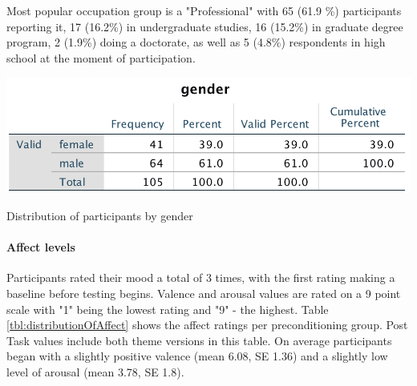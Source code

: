 	Most popular occupation group is a "Professional" with 65 (61.9 \%) participants reporting it, 17 (16.2\%) in undergraduate studies, 16 (15.2\%) in graduate degree program, 2 (1.9\%) doing a doctorate, as well as 5 (4.8\%) respondents in high school at the moment of participation.
	
\begin{table}[h!]
	\centering
	\includegraphics[width=0.7\linewidth]{graphics/Gender-distribution}
	\caption{Distribution of participants by gender}
	\label{tbl:gender-distribution}
\end{table}
	
	\paragraph{Affect levels} Participants rated their mood a total of 3 times, with the first rating making a baseline before testing begins. Valence and arousal values are rated on a 9 point scale with "1" being the lowest rating and "9" - the highest. Table \ref{tbl:distributionOfAffect} shows the affect ratings per preconditioning group. Post Task values include both theme versions in this table. On average participants began with a slightly positive valence (mean 6.08, SE 1.36) and a slightly low level of arousal (mean 3.78, SE 1.8).
	
